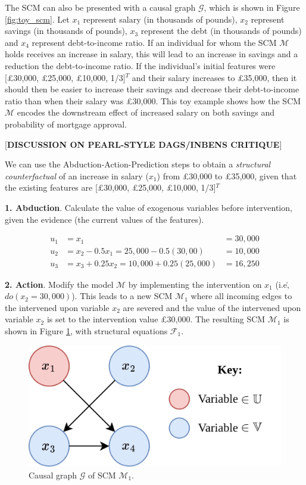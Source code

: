 The SCM can also be presented with a causal graph $\mathcal{G}$, which is shown in Figure \ref{fig:toy_scm}. Let $x_1$ represent salary (in thousands of pounds), $x_2$ represent savings (in thousands of pounds), $x_3$ represent the debt (in thousands of pounds) and $x_4$ represent debt-to-income ratio. If an individual for whom the SCM $\mathcal{M}$ holds receives an increase in salary, this will lead to an increase in savings and a reduction the debt-to-income ratio. If the individual's initial features were [£30,000, £25,000, £10,000, 1/3]$^T$ and their salary increases to £35,000, then it should then be easier to increase their savings and decrease their debt-to-income ratio than when their salary was £30,000. This toy example shows how the SCM $\mathcal{M}$ encodes the downstream effect of increased salary on both savings and probability of mortgage approval.

[\textbf{DISCUSSION ON PEARL-STYLE DAGS/INBENS CRITIQUE}]

We can use the Abduction-Action-Prediction steps \citep{pearl2016causal} to obtain a \textit{structural counterfactual} of an increase in salary ($x_1$) from £30,000 to £35,000, given that the existing features are [£30,000, £25,000, £10,000, 1/3]$^T$ 

\textbf{1. Abduction}. Calculate the value of exogenous variables before intervention, given the evidence (the current values of the features).

\begin{align}
	u_1 & = x_1 & =  30,000 \\ \nonumber
	u_2 & = x_2 - 0.5x_1 = 25,000 - 0.5(30,00) & = 10,000 \\ \nonumber
	u_3 & = x_3 + 0.25x_2 = 10,000 + 0.25(25,000) & = 16,250
\end{align}

\textbf{2. Action}. Modify the model $\mathcal{M}$ by implementing the intervention on $x_1$ (i.e\., $do(x_2=30,000)$). This leads to a new SCM $\mathcal{M}_1$ where all incoming edges to the intervened upon variable $x_2$ are severed and the value of the intervened upon variable $x_2$ is set to the intervention value £30,000. The resulting SCM $\mathcal{M}_1$ is shown in Figure \ref{fig:toy_scm_severed}, with structural equations $\mathcal{F}_1$.

\begin{figure}[!htb]
	\centering
	\includegraphics[width=0.6\linewidth]{images/draw.io/Simple SCM Severed.png}
	\caption{Causal graph $\mathcal{G}$ of SCM $\mathcal{M}_1$.}
	\label{fig:toy_scm_severed}
\end{figure}


